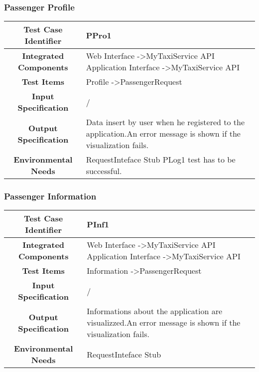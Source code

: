\documentclass[11pt, a4paper,titlepage]{article}
\begin{document}
	\subsubsection{Passenger Profile }
	\begin{tabularx}{\textwidth}{| c|X|}
		\hline \textbf{Test Case Identifier} & PPro1 \\
		\hline \textbf{Integrated Components} &  Web Interface -\textgreater MyTaxiService API \newline 
		Application Interface -\textgreater MyTaxiService API \\ 
		\hline \textbf{Test Items} & Profile -\textgreater PassengerRequest \\
		\hline \textbf{Input Specification} & / \\
		\hline \textbf{Output Specification} & Data insert by user when he registered to the application.\newline 	An error message is shown if the visualization fails. \\
		\hline \textbf{Environmental Needs} & RequestInteface Stub \newline PLog1 test has to be successful. \\
		\hline
	\end{tabularx}
	\newline
	\newline
	\subsubsection{Passenger Information }
	\begin{tabularx}{\textwidth}{| c|X|}
		\hline \textbf{Test Case Identifier} & PInf1 \\
		\hline \textbf{Integrated Components} &  Web Interface -\textgreater MyTaxiService API \newline 
		Application Interface -\textgreater MyTaxiService API \\
		\hline \textbf{Test Items} & Information -\textgreater PassengerRequest \\
		\hline \textbf{Input Specification} & / \\
		\hline \textbf{Output Specification} & Informations about the application are visualizzed.\newline An error message is shown if the visualization fails. \\
		\hline \textbf{Environmental Needs} & RequestInteface Stub \\
		\hline
	\end{tabularx}
	\newline
	\newline
\end{document}
